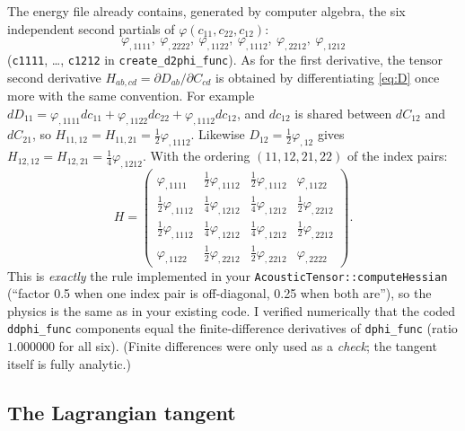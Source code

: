 \documentclass[11pt,a4paper]{article}
\theoremstyle{remark}
\newcommand{\code}[1]{\texttt{#1}}
\begin{document}
The energy file already contains, generated by computer algebra, the six independent
second partials of $\varphi(c_{11},c_{22},c_{12})$:
\[
\varphi_{,1111},\ \varphi_{,2222},\ \varphi_{,1122},\ \varphi_{,1112},\ \varphi_{,2212},\ \varphi_{,1212}
\]
(\code{c1111}, \dots, \code{c1212} in \code{create\_\allowbreak{}d2phi\_\allowbreak{}func}). As for the first derivative,
the tensor second derivative $H_{ab,cd} = \partial D_{ab}/\partial C_{cd}$ is obtained by
differentiating \eqref{eq:D} once more with the same convention. For example
$dD_{11} = \varphi_{,1111}dc_{11}+\varphi_{,1122}dc_{22}+\varphi_{,1112}dc_{12}$, and $dc_{12}$ is
shared between $dC_{12}$ and $dC_{21}$, so $H_{11,12}=H_{11,21}=\tfrac12\varphi_{,1112}$.
Likewise $D_{12}=\tfrac12\varphi_{,12}$ gives $H_{12,12}=H_{12,21}=\tfrac14\varphi_{,1212}$. With
the ordering $(11,12,21,22)$ of the index pairs:
\begin{equation}
H = \begin{pmatrix}
\varphi_{,1111} & \tfrac12\varphi_{,1112} & \tfrac12\varphi_{,1112} & \varphi_{,1122}\\[2pt]
\tfrac12\varphi_{,1112} & \tfrac14\varphi_{,1212} & \tfrac14\varphi_{,1212} & \tfrac12\varphi_{,2212}\\[2pt]
\tfrac12\varphi_{,1112} & \tfrac14\varphi_{,1212} & \tfrac14\varphi_{,1212} & \tfrac12\varphi_{,2212}\\[2pt]
\varphi_{,1122} & \tfrac12\varphi_{,2212} & \tfrac12\varphi_{,2212} & \varphi_{,2222}
\end{pmatrix}.
\label{eq:H}
\end{equation}
This is \emph{exactly} the rule implemented in your \code{AcousticTensor::\allowbreak{}computeHessian}
(``factor 0.5 when one index pair is off-diagonal, 0.25 when both are''), so the physics is
the same as in your existing code. I verified numerically that the coded
\code{ddphi\_\allowbreak{}func} components equal the finite-difference derivatives of \code{dphi\_\allowbreak{}func}
(ratio $1.000000$ for all six). (Finite differences were only used as a \emph{check}; the
tangent itself is fully analytic.)

\subsection{The Lagrangian tangent}
\end{document}
